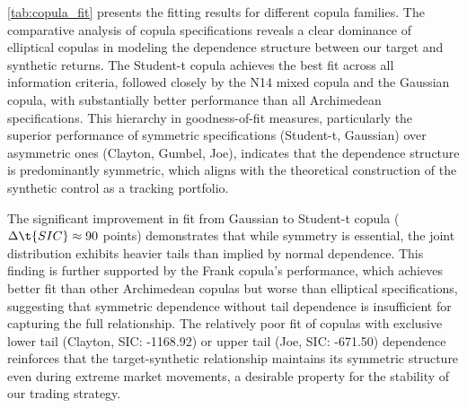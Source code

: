 

\cref{tab:copula_fit} presents the fitting results for different copula families.  The comparative analysis of copula specifications reveals a clear dominance of elliptical copulas in modeling the dependence structure between  our target and synthetic returns. The Student-t copula achieves the best fit across all information criteria, %
followed closely by the N14 mixed copula and the Gaussian copula, with substantially better performance than all Archimedean specifications. This hierarchy in goodness-of-fit measures, particularly the superior performance of symmetric specifications (Student-t, Gaussian) over asymmetric ones (Clayton, Gumbel, Joe), indicates that the dependence structure is predominantly symmetric, which aligns with the theoretical construction of the synthetic control as a tracking portfolio.

The significant improvement in fit from Gaussian to Student-t copula ($\Delta \t{SIC} \approx 90$ points) demonstrates that while symmetry is essential, the joint distribution exhibits heavier tails than implied by normal dependence. This finding is further supported by the Frank copula's performance, which achieves better fit than other Archimedean copulas but worse than elliptical specifications, suggesting that symmetric dependence without tail dependence is insufficient for capturing the full relationship. The relatively poor fit of copulas with exclusive lower tail (Clayton, SIC: -1168.92) or upper tail (Joe, SIC: -671.50) dependence reinforces that the target-synthetic relationship maintains its symmetric structure even during extreme market movements, a desirable property for the stability of our trading strategy.


